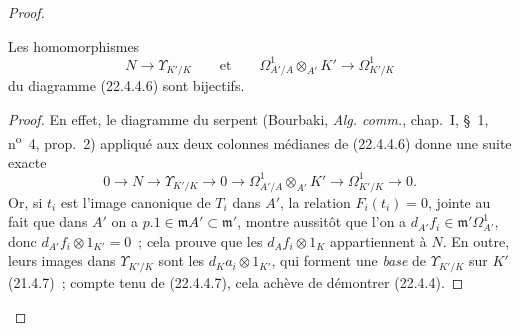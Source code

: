 \begin{proof}
\begin{lemma}[22.4.4.7]
\label{0.22.4.4.7-fr}
Les homomorphismes
\[
  N\longrightarrow\Upsilon_{K'/K}\qquad\text{et}\qquad
  \Omega^1_{A'/A}\otimes_{A'}K'\longrightarrow\Omega^1_{K'/K}
\]
du diagramme \textup{(22.4.4.6)} sont bijectifs.
\end{lemma}

\begin{proof}
En effet, le diagramme du serpent (Bourbaki, \emph{Alg. comm.}, chap.~I,
§~1, n\textsuperscript{o}~4, prop.~2) appliqué aux deux colonnes médianes de
(22.4.4.6) donne une suite exacte
\[
  0\longrightarrow N\longrightarrow\Upsilon_{K'/K}\longrightarrow0
  \longrightarrow\Omega^1_{A'/A}\otimes_{A'}K'
  \longrightarrow\Omega^1_{K'/K}\longrightarrow0.
\]
Or, si $t_i$ est l'image canonique de $T_i$ dans $A'$, la relation
$F_i(t_i)=0$, jointe au fait que dans $A'$ on a
$p.1\in\mathfrak mA'\subset\mathfrak m'$, montre aussitôt que l'on a
$d_{A'}f_i\in\mathfrak m'\Omega^1_{A'}$, donc
$d_{A'}f_i\otimes1_{K'}=0$~; cela prouve que les
$d_Af_i\otimes1_K$ appartiennent à $N$. En outre, leurs images dans
$\Upsilon_{K'/K}$ sont les $d_Ka_i\otimes1_{K'}$, qui forment une \emph{base} de
$\Upsilon_{K'/K}$ sur $K'$ (21.4.7)~; compte tenu de (22.4.4.7), cela achève
de démontrer (22.4.4).
\end{proof}
\end{proof}
